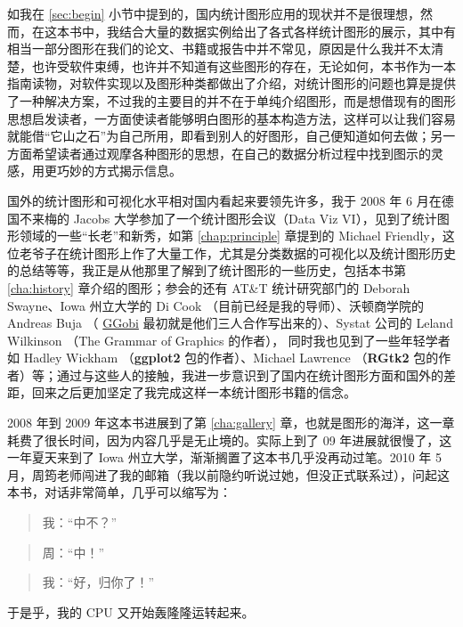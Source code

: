 \documentclass[
  b5paper,
  UTF8,twoside]{book}
\begin{document}
如我在 \ref{sec:begin} 小节中提到的，国内统计图形应用的现状并不是很理想，然而，在这本书中，我结合大量的数据实例给出了各式各样统计图形的展示，其中有相当一部分图形在我们的论文、书籍或报告中并不常见，原因是什么我并不太清楚，也许受软件束缚，也许并不知道有这些图形的存在，无论如何，本书作为一本指南读物，对软件实现以及图形种类都做出了介绍，对统计图形的问题也算是提供了一种解决方案，不过我的主要目的并不在于单纯介绍图形，而是想借现有的图形思想启发读者，一方面使读者能够明白图形的基本构造方法，这样可以让我们容易就能借``它山之石''为自己所用，即看到别人的好图形，自己便知道如何去做；另一方面希望读者通过观摩各种图形的思想，在自己的数据分析过程中找到图示的灵感，用更巧妙的方式揭示信息。

国外的统计图形和可视化水平相对国内看起来要领先许多，我于 2008 年 6 月在德国不来梅的 Jacobs 大学参加了一个统计图形会议（Data Viz VI），见到了统计图形领域的一些``长老''和新秀，如第 \ref{chap:principle} 章提到的 Michael Friendly，这位老爷子在统计图形上作了大量工作，尤其是分类数据的可视化以及统计图形历史的总结等等，我正是从他那里了解到了统计图形的一些历史，包括本书第 \ref{cha:history} 章介绍的图形；参会的还有 AT\&T 统计研究部门的 Deborah Swayne、Iowa 州立大学的 Di Cook （目前已经是我的导师）、沃顿商学院的 Andreas Buja （ \href{http://www.ggobi.org}{GGobi} 最初就是他们三人合作写出来的）、Systat 公司的 Leland Wilkinson （The Grammar of Graphics 的作者）， 同时我也见到了一些年轻学者如 Hadley Wickham （\textbf{ggplot2} 包的作者）、Michael Lawrence （\textbf{RGtk2} 包的作者）等；通过与这些人的接触，我进一步意识到了国内在统计图形方面和国外的差距，回来之后更加坚定了我完成这样一本统计图形书籍的信念。

2008 年到 2009 年这本书进展到了第 \ref{cha:gallery} 章，也就是图形的海洋，这一章耗费了很长时间，因为内容几乎是无止境的。实际上到了 09 年进展就很慢了，这一年夏天来到了 Iowa 州立大学，渐渐搁置了这本书几乎没再动过笔。2010 年 5 月，周筠老师闯进了我的邮箱（我以前隐约听说过她，但没正式联系过），问起这本书，对话非常简单，几乎可以缩写为：

\begin{quote}
我：``中不？''
\end{quote}

\begin{quote}
周：``中！''
\end{quote}

\begin{quote}
我：``好，归你了！''
\end{quote}

于是乎，我的 CPU 又开始轰隆隆运转起来。
\end{document}
